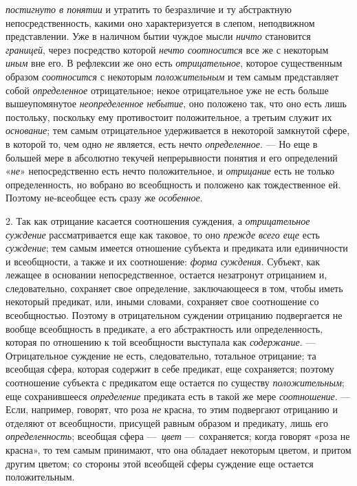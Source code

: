 \documentclass[twoside]{article}
\begin{document}
{{{{\em постигнуто в понятии}
и утратить то безразличие и ту абстрактную
непосредственность, какими оно характеризуется в слепом, неподвижном
представлении. Уже в наличном бытии чуждое мысли
{\em ничто} становится
{\em границей}, через
посредство которой {\em нечто
соотносится} все же с некоторым
{\em иным} вне его. В
рефлексии же оно есть
{\em отрицательное},
которое существенным образом
{\em соотносится} с
некоторым {\em положительным}
и тем самым представляет собой
{\em определенное}
отрицательное; некое отрицательное уже не есть больше
вышеупомянутое {\em неопределенное
небытие}, оно положено так, что оно есть лишь постольку,
поскольку ему противостоит положительное, а третьим служит их
{\em основание}; тем
самым отрицательное удерживается в некоторой замкнутой сфере, в которой то,
чем одно {\em не}
является, есть нечто
{\em определенное}. — Но
еще в большей мере в абсолютно текучей непрерывности понятия и его
определений «{\em не}»
непосредственно есть нечто положительное, и
{\em отрицание} есть не
только определенность, но вобрано во всеобщность и положено как
тождественное ей. Поэтому не-всеобщее есть сразу же
{\em особенное}.

2. Так как отрицание касается соотношения суждения, а
{\em отрицательное суждение}
рассматривается еще как таковое, то оно
{\em прежде всего еще}
есть {\em суждение};
тем самым имеется отношение субъекта и предиката или
единичности и всеобщности, а также и их соотношение:
{\em форма суждения}.
Субъект, как лежащее в основании непосредственное, остается
незатронут отрицанием и, следовательно, сохраняет свое определение,
заключающееся в том, чтобы иметь некоторый предикат, или, иными словами,
сохраняет свое соотношение со всеобщностью. Поэтому в отрицательном
суждении отрицанию подвергается не вообще всеобщность в предикате, а его
абстрактность или определенность, которая по отношению к той всеобщности
выступала как {\em содержание}. —
Отрицательное суждение не есть, следовательно, тотальное
отрицание; та всеобщая сфера, которая содержит в себе предикат, еще
сохраняется; поэтому соотношение субъекта с предикатом еще остается по
существу {\em положительным};
еще сохранившееся
{\em определение}
предиката есть в такой же мере
{\em соотношение}. —
Если, например, говорят, что роза
{\em не} красна, то этим
подвергают отрицанию и отделяют от всеобщности, присущей равным образом и
предикату, лишь его
{\em определенность};
всеобщая сфера
—~{\em цвет}
—~сохраняется; когда говорят «роза не красна», то тем самым
принимают, что она обладает некоторым цветом, и притом другим цветом; со
стороны этой всеобщей сферы суждение еще остается положительным.

}}}
\end{document}
